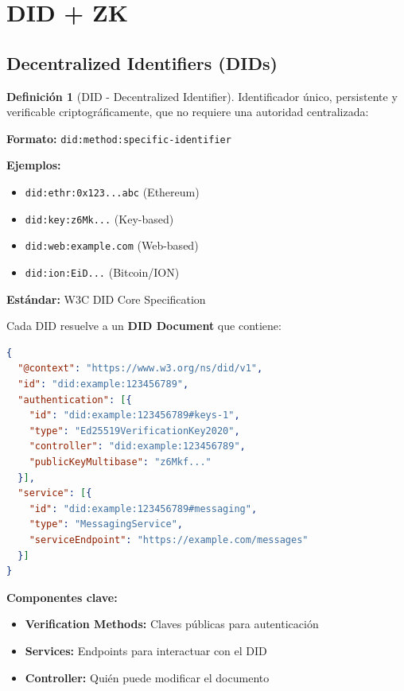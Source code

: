 \documentclass[11pt,a4paper,twoside]{book}
\theoremstyle{definition}
\newtheorem{definition}{Definición}[chapter]
\theoremstyle{remark}
\begin{document}
\section{DID + ZK}
\label{sec:did-zk}

\subsection{Decentralized Identifiers (DIDs)}

\begin{definition}[DID - Decentralized Identifier]
Identificador único, persistente y verificable criptográficamente, que no requiere una autoridad centralizada:

\textbf{Formato:} \texttt{did:method:specific-identifier}

\textbf{Ejemplos:}
\begin{itemize}
    \item \texttt{did:ethr:0x123...abc} (Ethereum)
    \item \texttt{did:key:z6Mk...} (Key-based)
    \item \texttt{did:web:example.com} (Web-based)
    \item \texttt{did:ion:EiD...} (Bitcoin/ION)
\end{itemize}

\textbf{Estándar:} W3C DID Core Specification
\end{definition}

\begin{mathnote}
Cada DID resuelve a un \textbf{DID Document} que contiene:

\begin{lstlisting}[language=json]
{
  "@context": "https://www.w3.org/ns/did/v1",
  "id": "did:example:123456789",
  "authentication": [{
    "id": "did:example:123456789#keys-1",
    "type": "Ed25519VerificationKey2020",
    "controller": "did:example:123456789",
    "publicKeyMultibase": "z6Mkf..."
  }],
  "service": [{
    "id": "did:example:123456789#messaging",
    "type": "MessagingService",
    "serviceEndpoint": "https://example.com/messages"
  }]
}
\end{lstlisting}

\textbf{Componentes clave:}
\begin{itemize}
    \item \textbf{Verification Methods:} Claves públicas para autenticación
    \item \textbf{Services:} Endpoints para interactuar con el DID
    \item \textbf{Controller:} Quién puede modificar el documento
\end{itemize}
\end{mathnote}
\end{document}
